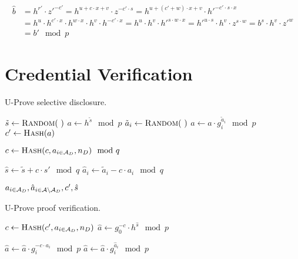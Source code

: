 \begin{align*}
  \hat{b}
  & = h^{r'} \cdot z'^{-c'}
  = h^{u + c \cdot x + v} \cdot z^{-c' \cdot s}
  = h^{u + (c' + w) \cdot x + v} \cdot h'^{-c' \cdot s \cdot x} \\
  & = h^u \cdot h^{c' \cdot x} \cdot h^{w \cdot x} \cdot h^v \cdot h^{-c' \cdot x}
  = h^u \cdot h^v \cdot h'^{s \cdot w \cdot x}
  = h'^{u \cdot s} \cdot h^v \cdot z^{s \cdot w}
  = b^s \cdot h^v \cdot z'^w \\
  & = b' \mod p
\end{align*}

\section{Credential Verification}

\begin{algorithm}
  \caption{U-Prove selective disclosure.}
  \label{alg:UP-selective-disclosure}
  \addtolength{\baselineskip}{1mm}
  \begin{algorithmic}[1]
      \State $\tilde{s} \gets \Call{Random}{~}$
      \State $a \gets h^{\tilde{s}} \mod p$
        \State $\tilde{a}_i \gets \Call{Random}{~}$
        \State $a \gets a \cdot g_i^{\tilde{a}_i} \mod p$
      \EndFor
      \State $c' \gets \Call{Hash}{a}$

      \State $c \gets \Call{Hash}{c, a_{i \in \A_D}, n_D} \mod q$

      \State $\hat{s} \gets \tilde{s} + c \cdot s' \mod q$
        \State $\hat{a}_i \gets \tilde{a}_i - c \cdot a_i \mod q$
      \EndFor

      \Return $a_{i \in \mathcal{A}_D}, \hat{a}_{i \in \mathcal{A} \setminus \mathcal{A}_D}, c', \hat{s}$
    \EndFunction
  \end{algorithmic}
\end{algorithm}

\begin{algorithm}
  \caption{U-Prove proof verification.}
  \label{alg:UP-verify-proof}
  \addtolength{\baselineskip}{1mm}
  \begin{algorithmic}[1]
      \State $c \gets \Call{Hash}{c', a_{i \in \A_D}, n_D}$
      \State $\hat{a} \gets g_0^{-c} \cdot h^{\hat{s}} \mod p$

        \State $\hat{a} \gets \hat{a} \cdot g_i^{-c \cdot a_i} \mod p$
      \EndFor
        \State $\hat{a} \gets \hat{a} \cdot g_i^{\hat{a}_i} \mod p$
      \EndFor

        \Return {}
      \EndIf

      \Return {}
    \EndFunction
  \end{algorithmic}
\end{algorithm}


